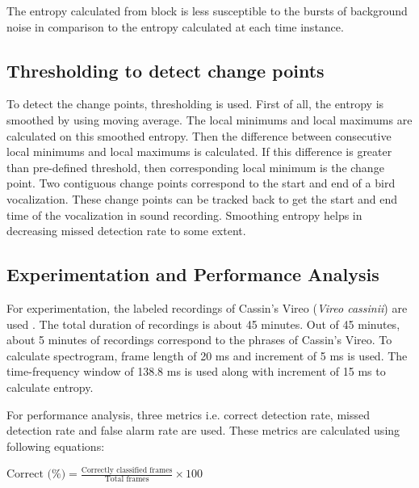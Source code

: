 \documentclass[a4paper]{article}
\begin{document}
\hspace{1cm}

The entropy calculated from block is less susceptible to the bursts of background noise in comparison to the entropy calculated at each time instance. 








\subsection{Thresholding to detect change points}

To detect the change points, thresholding is used. First of all, the entropy is smoothed by using moving average. The local minimums and local maximums are calculated on this smoothed entropy. Then the difference between consecutive local minimums and local maximums is calculated. If this difference is greater than pre-defined threshold, then corresponding local minimum is the change point. Two contiguous change points correspond to the start and end of a bird vocalization. These change points can be tracked back to get the start and end time of the vocalization in sound recording. Smoothing entropy helps in decreasing missed detection rate to some extent.    




\subsection{Experimentation and Performance Analysis}

For experimentation, the labeled recordings of Cassin’s Vireo (\textit{Vireo cassinii}) are used \cite{data}. The total duration of recordings is about 45 minutes. Out of 45 minutes, about 5 minutes of recordings correspond to the phrases of Cassin's Vireo. To calculate spectrogram, frame length of 20 ms and increment of  
5 ms is used. The time-frequency window of 138.8 ms is used along with increment of 15 ms to calculate entropy. 

For performance analysis, three metrics i.e. correct detection rate, missed detection rate and false alarm rate are used. These metrics are calculated using following equations:\newline



$\text{Correct (\%)}=\frac{\text{Correctly classified frames}} {\text{Total frames}} \times 100$\newline
\end{document}
